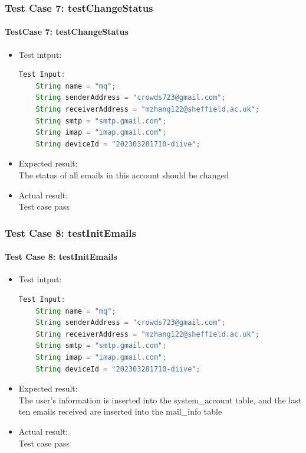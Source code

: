 \documentclass{article}
\begin{document}
\subsubsection{Test Case 7: testChangeStatus}
\paragraph{TestCase 7: testChangeStatus}
\begin{itemize}
\item Test intput: \\
    \begin{lstlisting}[language=Java]
    Test Input:
    String name = "mq";
    String senderAddress = "crowds723@gmail.com";
    String receiverAddress = "mzhang122@sheffield.ac.uk";
    String smtp = "smtp.gmail.com";
    String imap = "imap.gmail.com";
    String deviceId = "202303281710-diive";
    \end{lstlisting}
\item Expected result: \\
    The status of all emails in this account should be changed
\item Actual result: \\
    Test case pass
\end{itemize}

\subsubsection{Test Case 8: testInitEmails}
\paragraph{Test Case 8: testInitEmails}
\begin{itemize}
\item Test intput: \\
    \begin{lstlisting}[language=Java]
    Test Input:
    String name = "mq";
    String senderAddress = "crowds723@gmail.com";
    String receiverAddress = "mzhang122@sheffield.ac.uk";
    String smtp = "smtp.gmail.com";
    String imap = "imap.gmail.com";
    String deviceId = "202303281710-diive";
    \end{lstlisting}
\item Expected result: \\
    The user's information is inserted into the system\_account table, and the last ten emails received are inserted into the mail\_info table
\item Actual result: \\
    Test case pass
\end{itemize}
\end{document}

